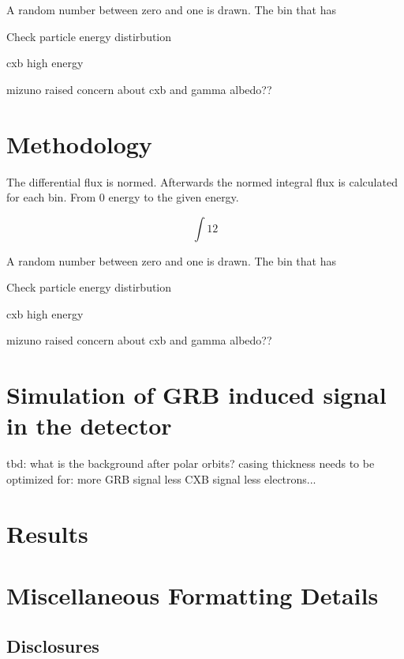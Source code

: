 \documentclass[12pt]{spieman}  %
\begin{document}
\begin{spacing}{2}
A random number between zero and one is drawn. The bin that has

Check particle energy distirbution

cxb high energy

mizuno raised concern about cxb and gamma albedo??
 
\section{Methodology} 
 
The differential flux is normed. Afterwards the normed integral flux is calculated for each bin. From 0 energy to the given energy.

$$ \int{1}{2} $$
 
A random number between zero and one is drawn. The bin that has

Check particle energy distirbution

cxb high energy

mizuno raised concern about cxb and gamma albedo??
 
\section{Simulation of GRB induced signal in the detector} 

tbd: what is the background after polar orbits?
casing thickness needs to be optimized for:
more GRB signal
less CXB signal
less electrons...

\section{Results}



\appendix    %

\section{Miscellaneous Formatting Details}
\label{sect:misc}


\subsection*{Disclosures}


\acknowledgments 





\end{spacing}
\end{document}
